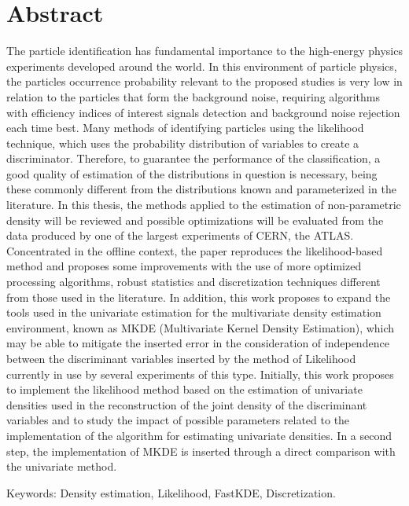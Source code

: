 %
%
\chapter*{Abstract}


\noindent The particle identification has fundamental importance to the high-energy physics experiments developed around the world. In this environment of particle physics, the particles occurrence probability relevant to the proposed studies is very low in relation to the particles that form the background noise, requiring algorithms with efficiency indices of interest signals detection and background noise rejection each time best. Many methods of identifying particles using the likelihood technique, which uses the probability distribution of variables to create a discriminator. Therefore, to guarantee the performance of the classification, a good quality of estimation of the distributions in question is necessary, being these commonly different from the distributions known and parameterized in the literature. In this thesis, the methods applied to the estimation of non-parametric density will be reviewed and possible optimizations will be evaluated from the data produced by one of the largest experiments of CERN, the ATLAS. Concentrated in the offline context, the paper reproduces the likelihood-based method and proposes some improvements with the use of more optimized processing algorithms, robust statistics and discretization techniques different from those used in the literature. In addition, this work proposes to expand the tools used in the univariate estimation for the multivariate density estimation environment, known as MKDE (Multivariate Kernel Density Estimation), which may be able to mitigate the inserted error in the consideration of independence between the discriminant variables inserted by the method of Likelihood currently in use by several experiments of this type. Initially, this work proposes to implement the likelihood method based on the estimation of univariate densities used in the reconstruction of the joint density of the discriminant variables and to study the impact of possible parameters related to the implementation of the algorithm for estimating univariate densities. In a second step, the implementation of MKDE is inserted through a direct comparison with the univariate method.


\vspace{0.5cm}

\noindent Keywords: Density estimation, Likelihood, FastKDE, Discretization. \\

\newpage
